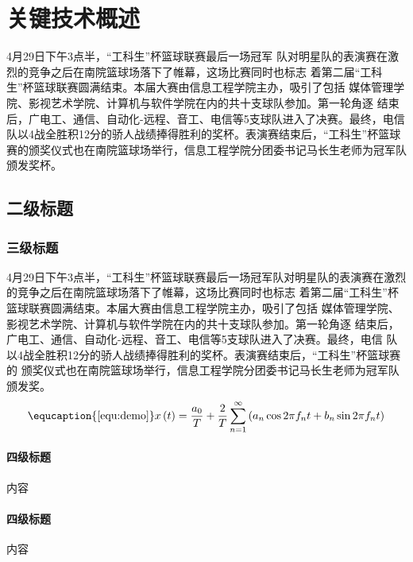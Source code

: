 
\chapter{关键技术概述}
\label{cha:2}
\par 4月29日下午3点半，“工科生”杯篮球联赛最后一场冠军 队对明星队的表演赛在激烈的竞争之后在南院篮球场落下了帷幕，这场比赛同时也标志 着第二届“工科生”杯篮球联赛圆满结束。本届大赛由信息工程学院主办，吸引了包括 媒体管理学院、影视艺术学院、计算机与软件学院在内的共十支球队参加。第一轮角逐 结束后，广电工、通信、自动化-远程、音工、电信等5支球队进入了决赛。最终，电信 队以4战全胜积12分的骄人战绩捧得胜利的奖杯。表演赛结束后，“工科生”杯篮球赛的颁奖仪式也在南院篮球场举行，信息工程学院分团委书记马长生老师为冠军队颁发奖杯。
\section{二级标题}
\subsection{三级标题}
\par 4月29日下午3点半，“工科生”杯篮球联赛最后一场冠军队对明星队的表演赛在激烈的竞争之后在南院篮球场落下了帷幕，这场比赛同时也标志 着第二届“工科生”杯篮球联赛圆满结束。本届大赛由信息工程学院主办，吸引了包括 媒体管理学院、影视艺术学院、计算机与软件学院在内的共十支球队参加。第一轮角逐 结束后，广电工、通信、自动化-远程、音工、电信等5支球队进入了决赛。最终，电信 队以4战全胜积12分的骄人战绩捧得胜利的奖杯。表演赛结束后，“工科生”杯篮球赛的 颁奖仪式也在南院篮球场举行，信息工程学院分团委书记马长生老师为冠军队颁发奖。
\begin{equation}
    \label{equ:demo}\equcaption{\ref{equ:demo}}
    x\left(t\right) = \frac{a_0}{T} + \frac{2}{T}\sum_{n=1}^{\infty}\left(a_n \cos 2\pi f_n t + b_n \sin 2\pi f_n t\right)
\end{equation}
\subsubsection{四级标题}
\par 内容
\subsubsection{四级标题}
\par 内容
